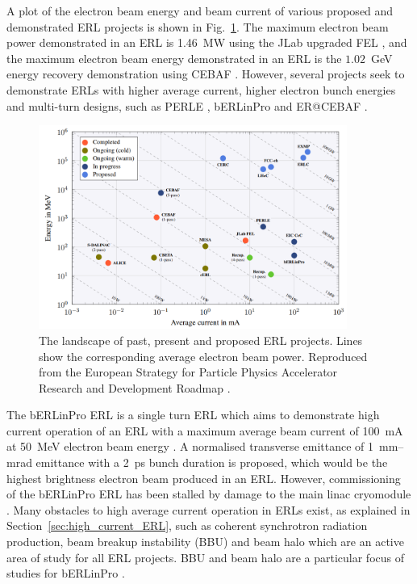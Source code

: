 \documentclass[../main.tex]{subfiles}
\begin{document}
A plot of the electron beam energy and beam current of various proposed and demonstrated ERL projects is shown in Fig.~\ref{fig:ERL_Landscape}. The maximum electron beam power demonstrated in an ERL is 1.46~\si{\mega\watt} using the JLab upgraded FEL \cite{neil2006jlab}, and the maximum electron beam energy demonstrated in an ERL is the $1.02$~\si{\giga\electronvolt} energy recovery demonstration using CEBAF \cite{bogacz2003cebaf,tennant2003beam}. However, several projects seek to demonstrate ERLs with higher average current, higher electron bunch energies and multi-turn designs, such as PERLE \cite{angal2018perle}, bERLinPro \cite{kuske2012conceptual} and ER@CEBAF \cite{meot2016er}.
\begin{figure}[!h]
\centering
\includegraphics[width=0.9\textwidth]{Figures/CBETA_Multi-Pass_Commissioning/Tennant_ERL_Landscape.pdf}
\caption{The landscape of past, present and proposed ERL projects. Lines show the corresponding average electron beam power. Reproduced from the European Strategy for Particle Physics
Accelerator Research and Development Roadmap \cite{adolphsen2022european}.}
\label{fig:ERL_Landscape}
\end{figure}

The bERLinPro ERL is a single turn ERL which aims to demonstrate high current operation of an ERL with a maximum average beam current of 100~\si{\milli\ampere} at 50~\si{\mega\electronvolt} electron beam energy \cite{kuske2012conceptual,neumann2018berlinpro}. A normalised transverse emittance of 1~\si{\milli\meter}--\si{\milli\radian} emittance with a 2~\si{\pico\second} bunch duration is proposed, which would be the highest brightness electron beam produced in an ERL. However, commissioning of the bERLinPro ERL has been stalled by damage to the main linac cryomodule \cite{neumann2018berlinpro}. Many obstacles to high average current operation in ERLs exist, as explained in Section~\ref{sec:high_current_ERL}, such as coherent synchrotron radiation production, beam breakup instability (BBU) and beam halo which are an active area of study for all ERL projects. BBU and beam halo are a particular focus of studies for bERLinPro \cite{neumann2012status,hwang2019first}.
\end{document}
